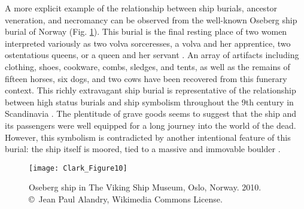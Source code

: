 A more explicit example of the relationship between ship burials, ancestor veneration, and necromancy can be observed from the well-known Oseberg ship burial of Norway (Fig. \ref{fig:Clark_Figure10}).
This burial is the final resting place of two women interpreted variously as two volva sorceresses, a volva and her apprentice, two ostentatious queens, or a queen and her servant \parencite{Ruffoni_2011}.
An array of artifacts including clothing, shoes, cookware, combs, sledges, and tents, as well as the remains of fifteen horses, six dogs, and two cows have been recovered from this funerary context. This richly extravagant ship burial is representative of the relationship between high status burials and ship symbolism throughout the 9th century in Scandinavia \parencite[20--25]{Ruffoni_2011}.
The plentitude of grave goods seems to suggest that the ship and its passengers were well equipped for a long journey into the world of the dead. However, this symbolism is contradicted by another intentional feature of this burial: the ship itself is moored, tied to a massive and immovable boulder \parencite[262]{Price_2008}.

\begin{figure}[!htb]
	\texttt{[image: Clark\_Figure10]}
	\caption{Oseberg ship in The Viking Ship Museum, Oslo, Norway. 2010.
		{\normalfont\scriptsize \\ \copyright\ Jean Paul Alandry, Wikimedia Commons License.
	}}
	\label{fig:Clark_Figure10}
\end{figure}


